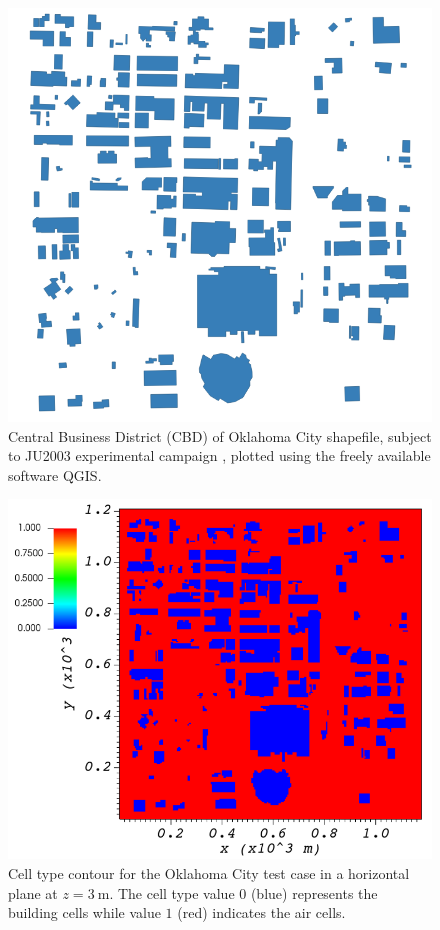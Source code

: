 \begin{figure}[H]
\centering
\includegraphics[width=13.0cm,keepaspectratio]{Images/OKC.png}
\caption{Central Business District (CBD) of Oklahoma City shapefile, subject to JU2003 experimental campaign \cite{allwine2006joint}, plotted using the freely available software QGIS.}
\end{figure}

\begin{figure}[H]
\centering
\includegraphics[width=\textwidth,keepaspectratio]{Images/oklahoma_z_3_icell.png}
\caption{Cell type contour for the Oklahoma City test case in a horizontal plane at $z=3\ \si{\metre}$. The cell type value $0$ (blue) represents the building cells while value $1$ (red) indicates the air cells.}
\end{figure}

